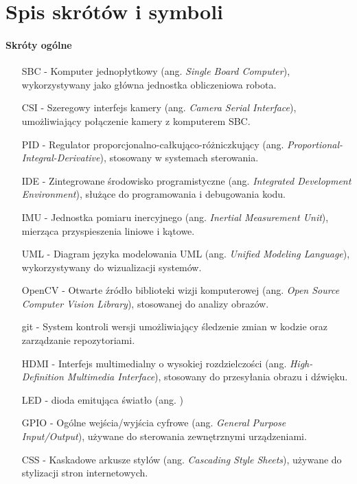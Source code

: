 \chapter{Spis skrótów i symboli}

\subsubsection*{Skróty ogólne}

\begin{itemize}
    \item[SBC] - Komputer jednopłytkowy (ang. \textit{Single Board Computer}), wykorzystywany jako główna jednostka obliczeniowa robota.
    \item[CSI] - Szeregowy interfejs kamery (ang. \textit{Camera Serial Interface}), umożliwiający połączenie kamery z komputerem SBC.
    \item[PID] - Regulator proporcjonalno-całkująco-różniczkujący (ang. \textit{Proportional-Integral-Derivative}), stosowany w systemach sterowania.
    \item[IDE] - Zintegrowane środowisko programistyczne (ang. \textit{Integrated Development Environment}), służące do programowania i debugowania kodu.
    \item[IMU] - Jednostka pomiaru inercyjnego (ang. \textit{Inertial Measurement Unit}), mierząca przyspieszenia liniowe i kątowe.
    \item[UML] - Diagram języka modelowania UML (ang. \textit{Unified Modeling Language}), wykorzystywany do wizualizacji systemów.
    \item[OpenCV] - Otwarte źródło biblioteki wizji komputerowej (ang. \textit{Open Source Computer Vision Library}), stosowanej do analizy obrazów.
    \item[git] - System kontroli wersji umożliwiający śledzenie zmian w kodzie oraz zarządzanie repozytoriami.
    \item[HDMI] - Interfejs multimedialny o wysokiej rozdzielczości (ang. \textit{High-Definition Multimedia Interface}), stosowany do przesyłania obrazu i dźwięku.
    \item[LED] -  dioda emitująca światło (ang. )
    \item[GPIO] - Ogólne wejścia/wyjścia cyfrowe (ang. \textit{General Purpose Input/Output}), używane do sterowania zewnętrznymi urządzeniami.
    \item[CSS] - Kaskadowe arkusze stylów (ang. \textit{Cascading Style Sheets}), używane do stylizacji stron internetowych.

\end{itemize}

